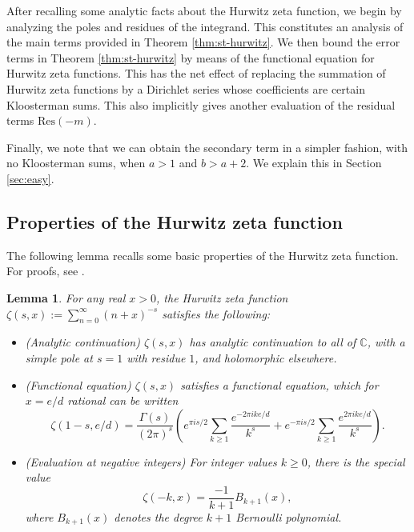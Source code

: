 \documentclass[12pt]{amsart}
\newtheorem{lemma}[theorem]{Lemma}
\numberwithin{equation}{section}
\numberwithin{theorem}{section}
\begin{document}
After recalling some analytic facts about the Hurwitz zeta function,
we begin by analyzing the poles and residues of the integrand.  This constitutes an analysis of the main terms provided in Theorem \ref{thm:st-hurwitz}.  We then bound the error terms in Theorem \ref{thm:st-hurwitz} by means of the functional equation for Hurwitz zeta functions.  This has the net effect of replacing the summation of Hurwitz zeta functions by a Dirichlet series whose coefficients are certain Kloosterman sums.  This also implicitly gives another evaluation of the residual terms $\mathrm{Res}(-m)$.

Finally, we note that we can obtain the secondary term in a simpler fashion, with no Kloosterman sums,
when $a > 1$ and $b > a + 2$. We explain this in Section \ref{sec:easy}.

\subsection{Properties of the Hurwitz zeta function}
The following lemma recalls some basic properties of the Hurwitz zeta function. For proofs, see \cite{Apostol}.
\begin{lemma}
	For any real $x > 0$, the Hurwitz zeta function $\zeta(s, x) := \sum_{n = 0}^{\infty} (n + x)^{-s}$ satisfies the following:
	\begin{itemize}
		\item {\upshape (Analytic continuation)} 
			$\zeta(s, x)$ has analytic continuation to all of $\mathbb{C}$, with a simple pole at $s = 1$ with residue $1$, and holomorphic elsewhere.
		\item {\upshape (Functional equation)} 
			$\zeta(s, x)$ satisfies a functional equation, which for $x = e/d$ rational can be written
			\begin{equation} \label{eqn:hurwitz-fe}
				\zeta(1-s,e/d)
					= \frac{\Gamma(s)}{(2\pi)^s} \left( e^{\pi i s/2} \sum_{k \geq 1} \frac{e^{-2\pi i ke/d}}{k^s} + e^{-\pi i s/2} \sum_{k \geq 1} \frac{e^{2\pi i ke/d}}{k^s}\right).
			\end{equation}
		\item {\upshape (Evaluation at negative integers)}
			For integer values $k \geq 0$, there is the special value
			\begin{equation}\label{eqn:zeta_neg_int}
				\zeta(-k, x) = \frac{-1}{k+1} B_{k+1}(x),
			\end{equation}
			where $B_{k+1}(x)$ denotes the degree $k+1$ Bernoulli polynomial. 
	\end{itemize}
\end{lemma}
\end{document}
